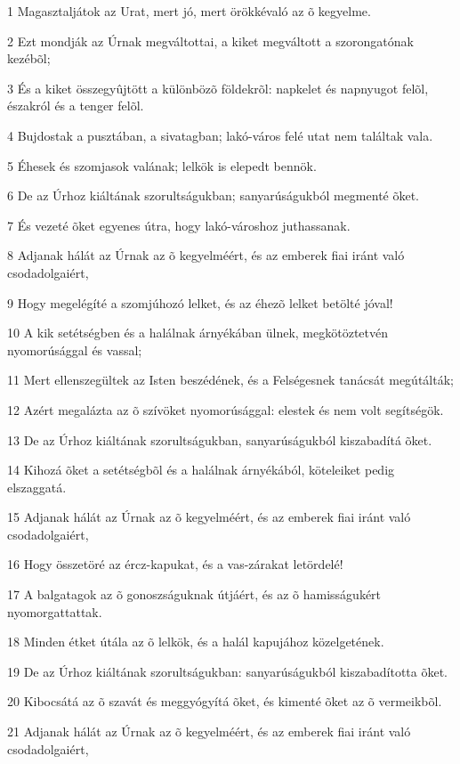 \par 1 Magasztaljátok az Urat, mert jó, mert örökkévaló az õ kegyelme.
\par 2 Ezt mondják az Úrnak megváltottai, a kiket megváltott a szorongatónak kezébõl;
\par 3 És a kiket összegyûjtött a különbözõ földekrõl: napkelet és napnyugot felõl, északról és a tenger felõl.
\par 4 Bujdostak a pusztában, a sivatagban; lakó-város felé utat nem találtak vala.
\par 5 Éhesek és szomjasok valának; lelkök is elepedt bennök.
\par 6 De az Úrhoz kiáltának szorultságukban; sanyarúságukból megmenté õket.
\par 7 És vezeté õket egyenes útra, hogy lakó-városhoz juthassanak.
\par 8 Adjanak hálát az Úrnak az õ kegyelméért, és az emberek fiai iránt való csodadolgaiért,
\par 9 Hogy megelégíté a szomjúhozó lelket, és az éhezõ lelket betölté jóval!
\par 10 A kik setétségben és a halálnak árnyékában ülnek, megkötöztetvén nyomorúsággal és vassal;
\par 11 Mert ellenszegültek az Isten beszédének, és a Felségesnek tanácsát megútálták;
\par 12 Azért megalázta az õ szívöket nyomorúsággal: elestek és nem volt segítségök.
\par 13 De az Úrhoz kiáltának szorultságukban, sanyarúságukból kiszabadítá õket.
\par 14 Kihozá õket a setétségbõl és a halálnak árnyékából, köteleiket pedig elszaggatá.
\par 15 Adjanak hálát az Úrnak az õ kegyelméért, és az emberek fiai iránt való csodadolgaiért,
\par 16 Hogy összetöré az ércz-kapukat, és a vas-zárakat letördelé!
\par 17 A balgatagok az õ gonoszságuknak útjáért, és az õ hamisságukért nyomorgattattak.
\par 18 Minden étket útála az õ lelkök, és a halál kapujához közelgetének.
\par 19 De az Úrhoz kiáltának szorultságukban: sanyarúságukból kiszabadította õket.
\par 20 Kibocsátá az õ szavát és meggyógyítá õket, és kimenté õket az õ vermeikbõl.
\par 21 Adjanak hálát az Úrnak az õ kegyelméért, és az emberek fiai iránt való csodadolgaiért,

